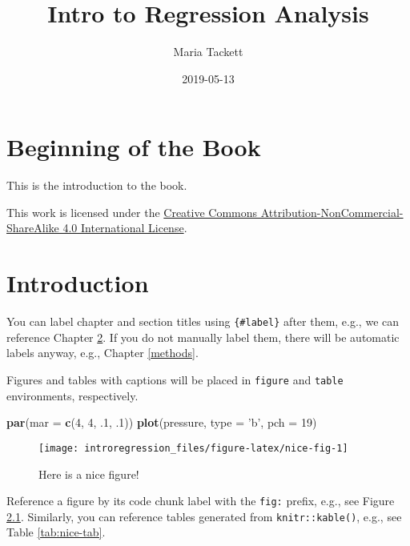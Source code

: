 \documentclass[]{book}
\title{Intro to Regression Analysis}
\author{Maria Tackett}
\date{2019-05-13}
\newenvironment{Shaded}{\begin{snugshade}}{\end{snugshade}}
\newcommand{\KeywordTok}[1]{\textcolor[rgb]{0.13,0.29,0.53}{\textbf{#1}}}
\newcommand{\DataTypeTok}[1]{\textcolor[rgb]{0.13,0.29,0.53}{#1}}
\newcommand{\DecValTok}[1]{\textcolor[rgb]{0.00,0.00,0.81}{#1}}
\newcommand{\StringTok}[1]{\textcolor[rgb]{0.31,0.60,0.02}{#1}}
\newcommand{\NormalTok}[1]{#1}
\begin{document}
\maketitle

{
\hypersetup{linkcolor=black}
\setcounter{tocdepth}{1}
\tableofcontents
}
\listoftables
\listoffigures
\chapter{Beginning of the Book}\label{beginning-of-the-book}

This is the introduction to the book.

This work is licensed under the
\href{http://creativecommons.org/licenses/by-nc-sa/4.0/}{Creative
Commons Attribution-NonCommercial-ShareAlike 4.0 International License}.

\chapter{Introduction}\label{intro}

You can label chapter and section titles using \texttt{\{\#label\}}
after them, e.g., we can reference Chapter \ref{intro}. If you do not
manually label them, there will be automatic labels anyway, e.g.,
Chapter \ref{methods}.

Figures and tables with captions will be placed in \texttt{figure} and
\texttt{table} environments, respectively.

\begin{Shaded}
\begin{Highlighting}[]
\KeywordTok{par}\NormalTok{(}\DataTypeTok{mar =} \KeywordTok{c}\NormalTok{(}\DecValTok{4}\NormalTok{, }\DecValTok{4}\NormalTok{, .}\DecValTok{1}\NormalTok{, .}\DecValTok{1}\NormalTok{))}
\KeywordTok{plot}\NormalTok{(pressure, }\DataTypeTok{type =} \StringTok{'b'}\NormalTok{, }\DataTypeTok{pch =} \DecValTok{19}\NormalTok{)}
\end{Highlighting}
\end{Shaded}

\begin{figure}

{\centering \texttt{[image: introregression\_files/figure-latex/nice-fig-1]} 

}

\caption{Here is a nice figure!}\label{fig:nice-fig}
\end{figure}

Reference a figure by its code chunk label with the \texttt{fig:}
prefix, e.g., see Figure \ref{fig:nice-fig}. Similarly, you can
reference tables generated from \texttt{knitr::kable()}, e.g., see Table
\ref{tab:nice-tab}.
\end{document}
